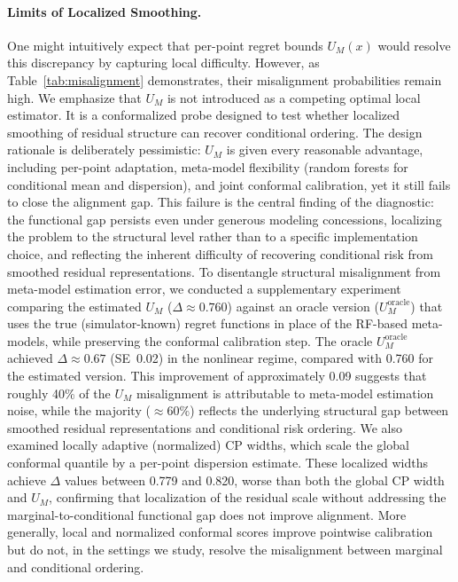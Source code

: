 \documentclass[pdflatex,sn-mathphys-ay]{sn-jnl}%
\theoremstyle{thmstyleone}%
\theoremstyle{thmstyletwo}%
\theoremstyle{thmstylethree}%
\begin{document}
\paragraph{Limits of Localized Smoothing.}
\label{sec:limits-of-smoothing}
One might intuitively expect that per-point regret bounds $U_M(x)$ would resolve this discrepancy by capturing local difficulty. However, as Table~\ref{tab:misalignment} demonstrates, their misalignment probabilities remain high. We emphasize that $U_M$ is not introduced as a competing optimal local estimator. It is a conformalized probe designed to test whether localized smoothing of residual structure can recover conditional ordering. The design rationale is deliberately pessimistic: $U_M$ is given every reasonable advantage, including per-point adaptation, meta-model flexibility (random forests for conditional mean and dispersion), and joint conformal calibration, yet it still fails to close the alignment gap. This failure is the central finding of the diagnostic: the functional gap persists even under generous modeling concessions, localizing the problem to the structural level rather than to a specific implementation choice, and reflecting the inherent difficulty of recovering conditional risk from smoothed residual representations. To disentangle structural misalignment from meta-model estimation error, we conducted a supplementary experiment comparing the estimated $U_M$ ($\Delta \approx 0.760$) against an oracle version ($U_M^{\text{oracle}}$) that uses the true (simulator-known) regret functions in place of the RF-based meta-models, while preserving the conformal calibration step. The oracle $U_M^{\text{oracle}}$ achieved $\Delta \approx 0.67$ (SE~0.02) in the nonlinear regime, compared with 0.760 for the estimated version. This improvement of approximately 0.09 suggests that roughly 40\% of the $U_M$ misalignment is attributable to meta-model estimation noise, while the majority ($\approx 60\%$) reflects the underlying structural gap between smoothed residual representations and conditional risk ordering. We also examined locally adaptive (normalized) CP widths, which scale the global conformal quantile by a per-point dispersion estimate. These localized widths achieve $\Delta$ values between 0.779 and 0.820, worse than both the global CP width and $U_M$, confirming that localization of the residual scale without addressing the marginal-to-conditional functional gap does not improve alignment. More generally, local and normalized conformal scores improve pointwise calibration but do not, in the settings we study, resolve the misalignment between marginal and conditional ordering.
\end{document}
